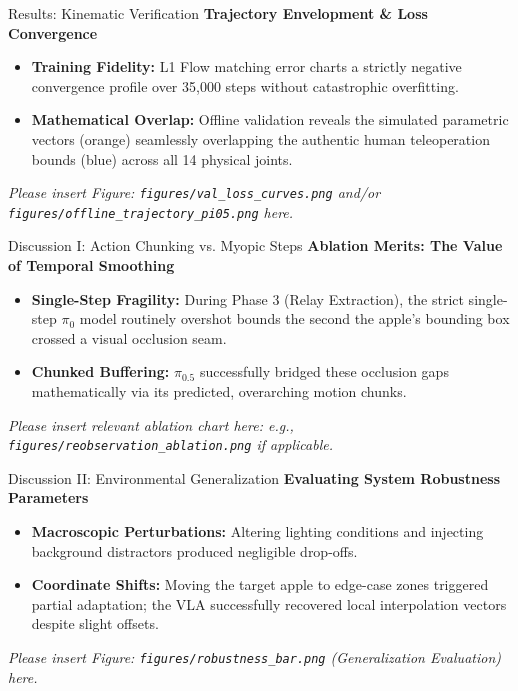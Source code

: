 \documentclass[aspectratio=169, t]{beamer}
\begin{document}
\begin{frame}{Results: Kinematic Verification}
    {\Large \textbf{Trajectory Envelopment \& Loss Convergence}}
    \vspace{0.5cm}
    \begin{itemize}
        \item \textbf{Training Fidelity:} L1 Flow matching error charts a strictly negative convergence profile over 35,000 steps without catastrophic overfitting. 
        \item \textbf{Mathematical Overlap:} Offline validation reveals the simulated parametric vectors (orange) seamlessly overlapping the authentic human teleoperation bounds (blue) across all 14 physical joints.
    \end{itemize}
    \vfill
    \textit{Please insert Figure: \texttt{figures/val_loss_curves.png} and/or \texttt{figures/offline_trajectory_pi05.png} here.}
\end{frame}

\begin{frame}{Discussion I: Action Chunking vs. Myopic Steps}
    {\Large \textbf{Ablation Merits: The Value of Temporal Smoothing}}
    \vspace{0.5cm}
    \begin{itemize}
        \item \textbf{Single-Step Fragility:} During Phase 3 (Relay Extraction), the strict single-step $\pi_0$ model routinely overshot bounds the second the apple's bounding box crossed a visual occlusion seam.
        \item \textbf{Chunked Buffering:} $\pi_{0.5}$ successfully bridged these occlusion gaps mathematically via its predicted, overarching motion chunks.
    \end{itemize}
    \vfill
    \textit{Please insert relevant ablation chart here: e.g., \texttt{figures/reobservation_ablation.png} if applicable.}
\end{frame}

\begin{frame}{Discussion II: Environmental Generalization}
    {\Large \textbf{Evaluating System Robustness Parameters}}
    \vspace{0.5cm}
    \begin{itemize}
        \item \textbf{Macroscopic Perturbations:} Altering lighting conditions and injecting background distractors produced negligible drop-offs.
        \item \textbf{Coordinate Shifts:} Moving the target apple to edge-case zones triggered partial adaptation; the VLA successfully recovered local interpolation vectors despite slight offsets. 
    \end{itemize}
    \vfill
    \textit{Please insert Figure: \texttt{figures/robustness_bar.png} (Generalization Evaluation) here.}
\end{frame}
\end{document}
